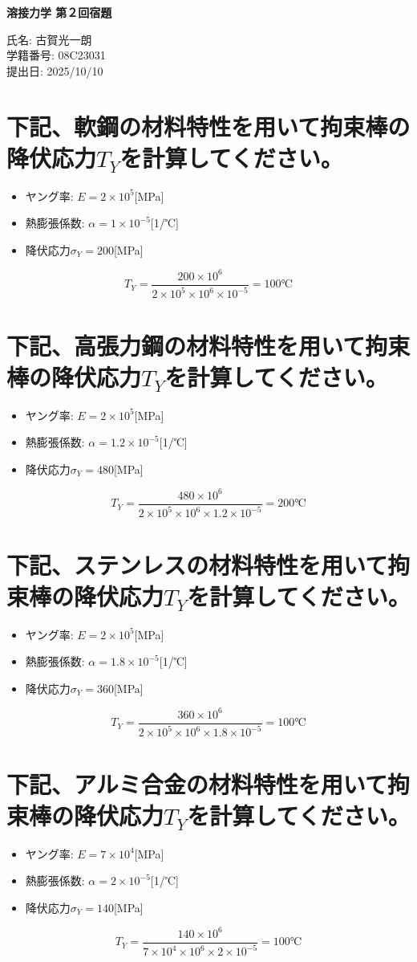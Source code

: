 \documentclass[10.5pt, a4paper]{article}
\begin{document}
\begin{center}
    \Large{\textbf{溶接力学 第２回宿題}}
\end{center}

\vspace{1cm} %


\noindent 氏名: 古賀光一朗 \\ 
学籍番号: 08C23031 \\
提出日: 2025/10/10
\vspace{1.5cm} %
\section{下記、軟鋼の材料特性を用いて拘束棒の降伏応力$T_Y$を計算してください。}
\begin{itemize}
    \item ヤング率: $E = 2\times10^{5}$[MPa]
    \item 熱膨張係数: $\alpha = 1\times10^{-5}$[1/℃]
    \item 降伏応力$\sigma_Y = 200$[MPa]
\end{itemize}
$$T_Y = \frac{200 \times10^6}{2 \times 10^5 \times 10^6 \times 10^{-5}}=100\text{℃}$$
\section{下記、高張力鋼の材料特性を用いて拘束棒の降伏応力$T_Y$を計算してください。}
\begin{itemize}
    \item ヤング率: $E = 2\times10^{5}$[MPa]
    \item 熱膨張係数: $\alpha = 1.2 \times10^{-5}$[1/℃]
    \item 降伏応力$\sigma_Y = 480$[MPa]
\end{itemize}
$$T_Y = \frac{480 \times10^6}{2 \times 10^5 \times 10^6 \times 1.2\times 10^{-5}}=200\text{℃}$$
\section{下記、ステンレスの材料特性を用いて拘束棒の降伏応力$T_Y$を計算してください。}
\begin{itemize}
    \item ヤング率: $E = 2\times10^{5}$[MPa]
    \item 熱膨張係数: $\alpha = 1.8\times10^{-5}$[1/℃]
    \item 降伏応力$\sigma_Y = 360$[MPa]
\end{itemize}
$$T_Y = \frac{360 \times10^6}{2 \times 10^5 \times 10^6 \times 1.8 \times 10^{-5}}=100\text{℃}$$
\section{下記、アルミ合金の材料特性を用いて拘束棒の降伏応力$T_Y$を計算してください。}
\begin{itemize}
    \item ヤング率: $E = 7\times10^{4}$[MPa]
    \item 熱膨張係数: $\alpha = 2\times10^{-5}$[1/℃]
    \item 降伏応力$\sigma_Y = 140$[MPa]
\end{itemize}
$$T_Y = \frac{140 \times10^6}{7 \times 10^4 \times 10^6 \times 2 \times 10^{-5}}=100\text{℃}$$
\end{document}

